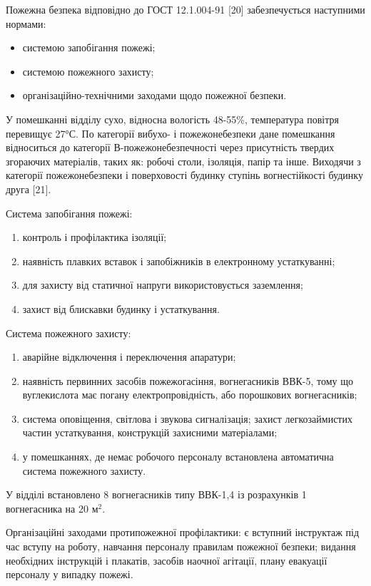 Пожежна безпека відповідно до ГОСТ 12.1.004-91 [20]  забезпечується наступними нормами:
\begin{itemize}
\item системою запобігання пожежі;
\item системою пожежного захисту;
\item організаційно-технічними заходами щодо пожежної безпеки.
\end{itemize}

У помешканні відділу сухо, відносна вологість 48-55\%, температура повітря перевищує 27°С. По категорії вибухо- і пожежонебезпеки дане помешкання відноситься до категорії В-пожежонебезпечності через присутність твердих згораючих матеріалів, таких як: робочі столи, ізоляція, папір та інше. Виходячи з категорії пожежонебезпеки і поверховості будинку ступінь вогнестійкості будинку друга [21].

Система запобігання пожежі:
\begin{enumerate}
\item контроль і профілактика ізоляції;
\item наявність плавких вставок і запобіжників в електронному устаткуванні;
\item для захисту від статичної напруги використовується заземлення;
\item захист від блискавки будинку і устаткування.
\end{enumerate}

Система пожежного захисту:
\begin{enumerate}
\item аварійне відключення і переключення апаратури; 
\item наявність первинних засобів пожежогасіння, вогнегасників ВВК-5, тому що вуглекислота має погану електропровідність, або порошкових вогнегасників;
\item система оповіщення, світлова і звукова сигналізація; захист легкозаймистих частин устаткування, конструкцій захисними матеріалами;
\item у помешканнях, де немає робочого персоналу встановлена автоматична система пожежного захисту.
\end{enumerate}

У відділі встановлено 8 вогнегасників типу ВВК-1,4  із розрахунків 1
вогнегасника на 20 $\text{м}^\text{2}$.

Організаційні заходами протипожежної профілактики: є вступний інструктаж під час вступу на роботу, навчання персоналу правилам пожежної безпеки; видання необхідних інструкцій і плакатів, засобів наочної агітації, плану евакуації персоналу у випадку пожежі.

